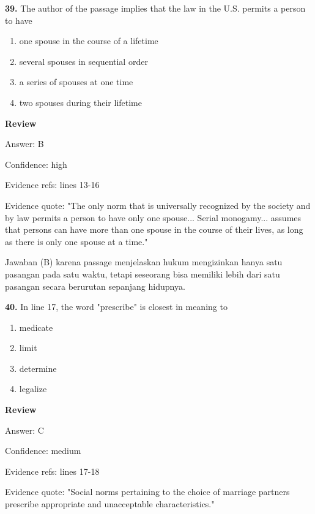 \documentclass[12pt]{article}
\begin{document}
\endgroup
\par
\vspace{0.25\baselineskip}
\noindent\textbf{39.} The author of the passage implies that the law in the U.S. permits a person to have
\begin{enumerate}[label=(\Alph*),leftmargin=*,itemsep=0.2em]
\item one spouse in the course of a lifetime
\item several spouses in sequential order
\item a series of spouses at one time
\item two spouses during their lifetime
\end{enumerate}
\par
\begingroup
\setlength{\parskip}{0pt}
\setlength{\parindent}{0pt}
\textbf{Review}\par
Answer: B\par
Confidence: high\par
Evidence refs: lines 13-16\par
Evidence quote: "The only norm that is universally recognized by the society and by law permits a person to have only one spouse... Serial monogamy... assumes that persons can have more than one spouse in the course of their lives, as long as there is only one spouse at a time."\par
Jawaban (B) karena passage menjelaskan hukum mengizinkan hanya satu pasangan pada satu waktu, tetapi seseorang bisa memiliki lebih dari satu pasangan secara berurutan sepanjang hidupnya.\par
\endgroup
\par
\vspace{0.25\baselineskip}
\noindent\textbf{40.} In line 17, the word "prescribe" is closest in meaning to
\begin{enumerate}[label=(\Alph*),leftmargin=*,itemsep=0.2em]
\item medicate
\item limit
\item determine
\item legalize
\end{enumerate}
\par
\begingroup
\setlength{\parskip}{0pt}
\setlength{\parindent}{0pt}
\textbf{Review}\par
Answer: C\par
Confidence: medium\par
Evidence refs: lines 17-18\par
Evidence quote: "Social norms pertaining to the choice of marriage partners prescribe appropriate and unacceptable characteristics."\par
\end{document}
